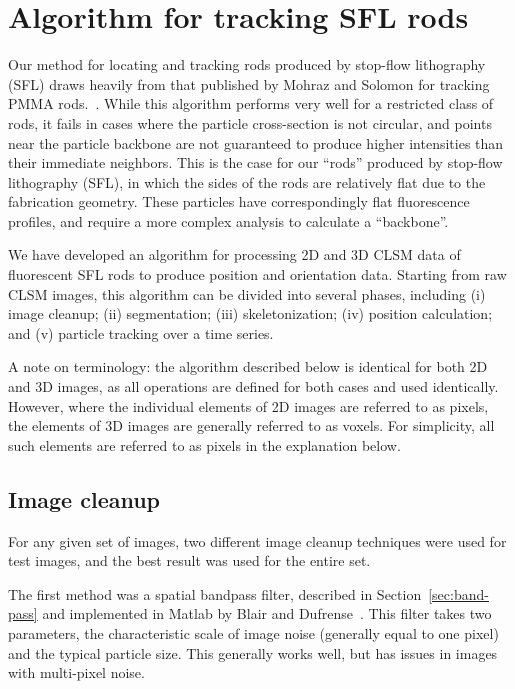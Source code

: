 \section{Algorithm for tracking SFL rods}
\label{sec:rod-tracking}

Our method for locating and tracking rods produced by stop-flow lithography (SFL) draws heavily from that published by 
Mohraz and Solomon for tracking PMMA rods.~\cite{rods-mohraz}.
While this algorithm performs very well for a restricted class of rods, it fails in cases where the particle
cross-section is not circular, and points near the particle backbone are not guaranteed to produce higher 
intensities than their immediate neighbors.  This is the case for our ``rods'' produced by stop-flow
lithography (SFL), in which the sides of the rods are relatively flat due to the fabrication
geometry. These particles have correspondingly flat fluorescence profiles, and require a more complex analysis
to calculate a ``backbone''.

We have developed an algorithm for processing 2D and 3D CLSM data of fluorescent SFL rods to
produce position and orientation data.  Starting from raw CLSM images, this algorithm can be divided
into several phases, including (i) image cleanup; (ii) segmentation; (iii) skeletonization;
(iv) position calculation; and
(v) particle tracking over a time series.  

A note on terminology: the algorithm described below is identical for both 2D and 3D images, as all
operations are defined for both cases and used identically. However, where the individual elements of
2D images are referred to as pixels, the elements of 3D images are generally referred to as voxels.
For simplicity, all such elements are referred to as pixels in the explanation below.

\subsection{Image cleanup}

For any given set of images, two different image cleanup techniques were used for test
images, and the best result was used for the entire set.

The first method was a spatial bandpass filter, described in 
Section~\ref{sec:band-pass} and implemented in Matlab by Blair and
Dufrense~\cite{blair-dufrense-matlab}. This filter takes two parameters, the characteristic scale
of image noise (generally equal to one pixel) and the typical particle size.  This 
generally works well,
but has issues in images with multi-pixel noise.

